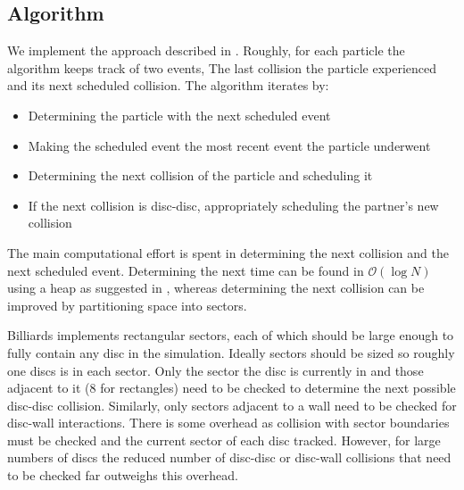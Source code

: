 \documentclass{article}
\begin{document}
\subsection{Algorithm}
We implement the approach described in \cite{Lubachevsky-1991}. Roughly, for each particle the algorithm keeps track of two events, The last collision the particle experienced and its next scheduled collision. The algorithm iterates by:
\begin{itemize}
    \item Determining the particle with the next scheduled event
    \item Making the scheduled event the most recent event the particle underwent 
    \item Determining the next collision of the particle and scheduling it
    \item If the next collision is disc-disc, appropriately scheduling the partner's new collision
\end{itemize}
The main computational effort is spent in determining the next collision and the next scheduled event. Determining the next time can be found in $\mathcal{O}(\log N)$ using a heap as suggested in \cite{Lubachevsky-1991}, whereas determining the next collision can be improved by partitioning space into sectors.

Billiards implements rectangular sectors, each of which should be large enough to fully contain any disc in the simulation. Ideally sectors should be sized so roughly one discs is in each sector. Only the sector the disc is currently in and those adjacent to it (8 for rectangles) need to be checked to determine the next possible disc-disc collision. Similarly, only sectors adjacent to a wall need to be checked for disc-wall interactions. There is some overhead as collision with sector boundaries must be checked and the current sector of each disc tracked. However, for large numbers of discs the reduced number of disc-disc or disc-wall collisions that need to be checked far outweighs this overhead.



\end{document}
